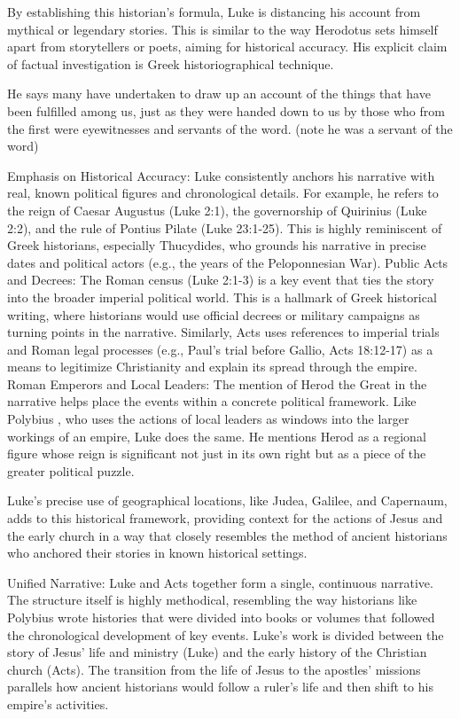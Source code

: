 By establishing this historian's formula, Luke is distancing his account from mythical or legendary stories.
This is similar to the way Herodotus sets himself apart from storytellers or poets, aiming for historical accuracy.
His explicit claim of factual investigation is Greek historiographical technique.

He says many have undertaken to draw up an account of the things that have been fulfilled among us, just as they were handed down to us by those who from the first were eyewitnesses and servants of the word.
(note he was a servant of the word)

Emphasis on Historical Accuracy: Luke consistently anchors his narrative with real, known political figures and chronological details.
For example, he refers to the reign of Caesar Augustus (Luke 2:1), the governorship of Quirinius (Luke 2:2), and the rule of Pontius Pilate (Luke 23:1-25).
This is highly reminiscent of Greek historians, especially Thucydides, who grounds his narrative in precise dates and political actors (e.g., the years of the Peloponnesian War).
Public Acts and Decrees: The Roman census (Luke 2:1-3) is a key event that ties the story into the broader imperial political world.
This is a hallmark of Greek historical writing, where historians would use official decrees or military campaigns as turning points in the narrative.
Similarly, Acts uses references to imperial trials and Roman legal processes (e.g., Paul's trial before Gallio, Acts 18:12-17) as a means to legitimize Christianity and explain its spread through the empire.
Roman Emperors and Local Leaders: The mention of Herod the Great in the narrative helps place the events within a concrete political framework.
Like Polybius \cite{polybius:histories}, who uses the actions of local leaders as windows into the larger workings of an empire, Luke does the same.
He mentions Herod as a regional figure whose reign is significant not just in its own right but as a piece of the greater political puzzle.

Luke's precise use of geographical locations, like Judea, Galilee, and Capernaum, adds to this historical framework, providing context for the actions of Jesus and the early church in a way that closely resembles the method of ancient historians who anchored their stories in known historical settings.

Unified Narrative: Luke and Acts together form a single, continuous narrative.
The structure itself is highly methodical, resembling the way historians like Polybius wrote histories that were divided into books or volumes that followed the chronological development of key events.
Luke's work is divided between the story of Jesus' life and ministry (Luke) and the early history of the Christian church (Acts).
The transition from the life of Jesus to the apostles' missions parallels how ancient historians would follow a ruler's life and then shift to his empire's activities.

